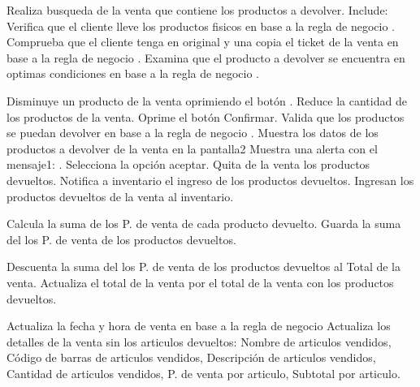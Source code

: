 \begin{UCtrayectoria}

	\UCpaso [\UCactor]  Realiza busqueda de la venta que contiene los productos a devolver. Include: 
	\UCpaso [\UCactor] Verifica que el cliente lleve los productos fisicos en base a la regla de negocio  .
	\UCpaso [\UCactor] Comprueba que el cliente tenga en original y una copia el ticket de la venta en base a la regla de negocio  . 
\UCpaso [\UCactor] Examina que el producto a devolver se encuentra en optimas condiciones en base a la regla de negocio . 


	\UCpaso [\UCactor] Disminuye un producto de la venta oprimiendo el botón \cdtButton{-}.
	\UCpaso [\UCactor] Reduce la cantidad de los productos de la venta.
	\UCpaso [\UCactor] Oprime el botón Confirmar. 
	\UCpaso [\UCsist] Valida que los productos se puedan devolver en base a la regla de negocio . 
	\UCpaso [\UCsist] Muestra los datos de los productos a devolver de la venta en la pantalla2 
	\UCpaso [\UCsist] Muestra una alerta con el mensaje1: .
	\UCpaso [\UCactor] Selecciona la opción aceptar.  
	\UCpaso [\UCsist] Quita de la venta los productos devueltos.
	\UCpaso [\UCsist] Notifica a inventario el ingreso de los productos devueltos.
	\UCpaso [\UCsist] Ingresan los productos devueltos de la venta al inventario.

	\UCpaso [\UCsist] Calcula la suma de los  P. de venta de cada producto devuelto.
	\UCpaso [\UCsist] Guarda la suma del los P. de venta de los productos devueltos.

	
	\UCpaso[\UCsist] Descuenta la suma del  los P. de venta de los productos devueltos al Total de la venta.
	\UCpaso [\UCsist] Actualiza el total de la venta por el total de la venta con los productos devueltos.
	
	\UCpaso [\UCsist] Actualiza la fecha y hora de venta en base a la regla de negocio 
	\UCpaso [\UCsist] Actualiza los detalles de la venta sin los articulos devueltos: Nombre de articulos vendidos, Código de barras de articulos vendidos, Descripción de articulos vendidos, Cantidad de articulos vendidos, P. de venta por articulo, Subtotal por articulo.
	

\end{UCtrayectoria}
